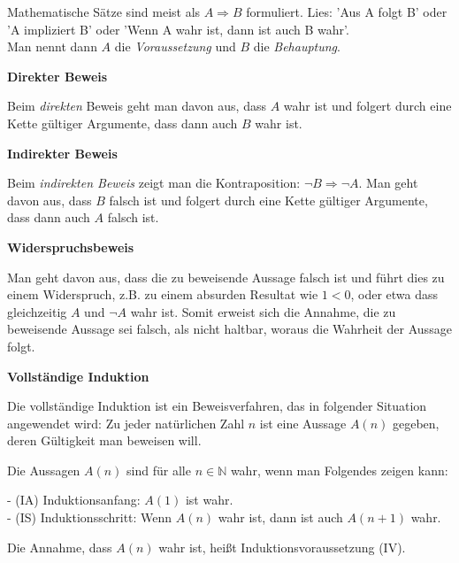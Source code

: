\documentclass[a4paper]{article}
\begin{document}
\parindent 0mm

Mathematische Sätze sind meist als $A \Rightarrow B$ formuliert. Lies: 'Aus A folgt B' oder 'A impliziert B' oder 'Wenn A wahr ist, dann ist auch B wahr'. \\
 
Man nennt dann $A$ die \textit{Voraussetzung} und $B$ die \textit{Behauptung}. 

\bigskip

\textbf{Direkter Beweis}
\bigskip

Beim \textit{direkten} Beweis geht man davon aus, dass $A$ wahr ist und folgert durch eine Kette gültiger Argumente, dass dann auch $B$ wahr ist. 
\bigskip

\textbf{Indirekter Beweis}
\bigskip

Beim \textit{indirekten Beweis} zeigt man die Kontraposition:
 $\lnot B \Rightarrow \lnot A$. Man geht davon aus, dass $B$ falsch ist und folgert durch eine Kette
 gültiger Argumente, dass dann auch $A$ falsch ist.
\bigskip
 
\textbf{Widerspruchsbeweis}
\bigskip

 Man geht davon aus, dass die zu beweisende Aussage falsch ist
und führt dies zu einem Widerspruch, z.B. zu einem absurden Resultat wie $1 < 0$, oder etwa dass gleichzeitig $A$ und $\lnot A$ wahr ist. Somit erweist sich die Annahme, die zu beweisende Aussage sei falsch, als nicht haltbar, woraus die Wahrheit der Aussage folgt.
\bigskip

\textbf{Vollständige Induktion}
\bigskip

 Die vollständige Induktion ist ein Beweisverfahren, das in folgender Situation angewendet wird: 
 Zu jeder natürlichen Zahl $n$ ist eine Aussage
$A(n)$ gegeben, deren Gültigkeit man beweisen will.

Die Aussagen $A(n)$ sind für alle $n \in \mathbb{N}$ wahr, wenn man Folgendes zeigen kann:

- (IA) Induktionsanfang: $A(1)$ ist wahr. \\
- (IS) Induktionsschritt: Wenn $A(n)$ wahr ist, dann ist auch $A(n+1)$ wahr.

Die Annahme, dass $A(n)$ wahr ist, heißt Induktionsvoraussetzung (IV).
\end{document}
